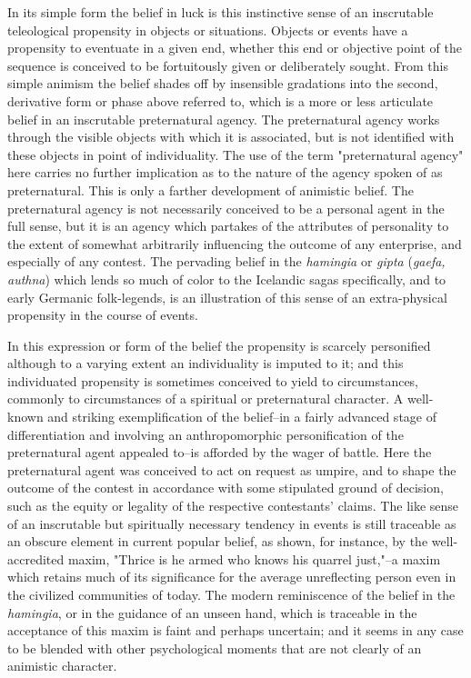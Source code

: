 \documentclass[12pt]{report}
\begin{document}
In its simple form the belief in luck is this instinctive sense of an
inscrutable teleological propensity in objects or situations. Objects or
events have a propensity to eventuate in a given end, whether this end
or objective point of the sequence is conceived to be fortuitously given
or deliberately sought. From this simple animism the belief shades off
by insensible gradations into the second, derivative form or phase above
referred to, which is a more or less articulate belief in an inscrutable
preternatural agency. The preternatural agency works through the visible
objects with which it is associated, but is not identified with these
objects in point of individuality. The use of the term "preternatural
agency" here carries no further implication as to the nature of the
agency spoken of as preternatural. This is only a farther development of
animistic belief. The preternatural agency is not necessarily conceived
to be a personal agent in the full sense, but it is an agency which
partakes of the attributes of personality to the extent of somewhat
arbitrarily influencing the outcome of any enterprise, and especially
of any contest. The pervading belief in the \emph{hamingia} or \emph{gipta}
(\emph{gaefa, authna}) which lends so much of color to the Icelandic sagas
specifically, and to early Germanic folk-legends, is an illustration of
this sense of an extra-physical propensity in the course of events.

In this expression or form of the belief the propensity is scarcely
personified although to a varying extent an individuality is imputed to
it; and this individuated propensity is sometimes conceived to yield to
circumstances, commonly to circumstances of a spiritual or preternatural
character. A well-known and striking exemplification of the belief--in
a fairly advanced stage of differentiation and involving an
anthropomorphic personification of the preternatural agent appealed
to--is afforded by the wager of battle. Here the preternatural agent was
conceived to act on request as umpire, and to shape the outcome of the
contest in accordance with some stipulated ground of decision, such as
the equity or legality of the respective contestants' claims. The like
sense of an inscrutable but spiritually necessary tendency in events
is still traceable as an obscure element in current popular belief, as
shown, for instance, by the well-accredited maxim, "Thrice is he
armed who knows his quarrel just,"--a maxim which retains much of its
significance for the average unreflecting person even in the civilized
communities of today. The modern reminiscence of the belief in the
\emph{hamingia}, or in the guidance of an unseen hand, which is traceable in
the acceptance of this maxim is faint and perhaps uncertain; and it
seems in any case to be blended with other psychological moments that
are not clearly of an animistic character.
\end{document}
